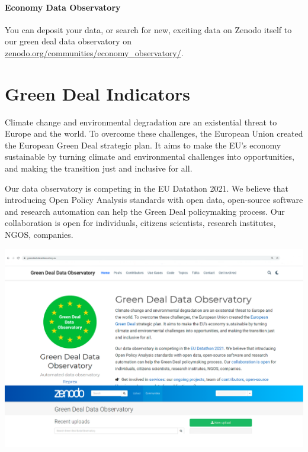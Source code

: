 \documentclass[
  a4paper,
  openany, a4paper, oneside]{book}
\begin{document}
\hypertarget{economy-data-observatory}{%
\subsubsection{Economy Data Observatory}\label{economy-data-observatory}}

You can deposit your data, or search for new, exciting data on Zenodo itself to our green deal data observatory on \href{https://zenodo.org/communities/economy_observatory?page=1\&size=20}{zenodo.org/communities/economy\_observatory/}.

\hypertarget{green-deal}{%
\chapter{Green Deal Indicators}\label{green-deal}}

Climate change and environmental degradation are an existential threat to Europe and the world. To overcome these challenges, the European Union created the European Green Deal strategic plan. It aims to make the EU's economy sustainable by turning climate and environmental challenges into opportunities, and making the transition just and inclusive for all.

Our data observatory is competing in the EU Datathon 2021. We believe that introducing Open Policy Analysis standards with open data, open-source software and research automation can help the Green Deal policymaking process. Our collaboration is open for individuals, citizens scientists, research institutes, NGOS, companies.

\begin{center}\includegraphics[width=26.32in]{plots/screenshots/greendeal_and_zenodo} \end{center}
\end{document}
